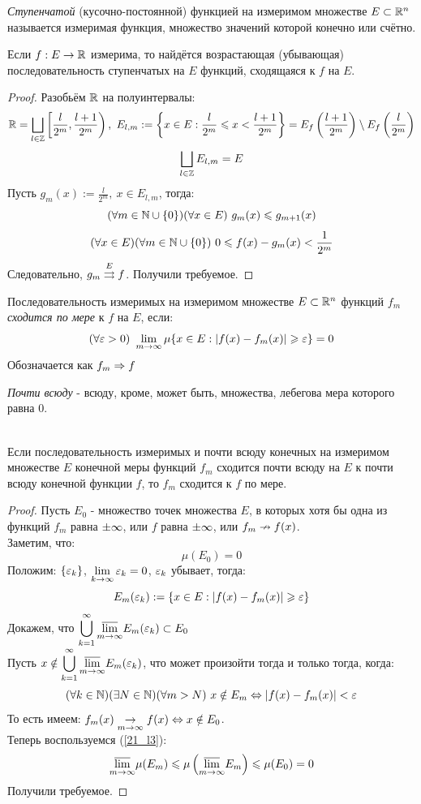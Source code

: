 \begin{definition}
	\textit{Ступенчатой} (кусочно-постоянной) функцией на измеримом множестве $E\subset\mathbb{R}^n$ называется измеримая функция, множество значений которой конечно или счётно.
\end{definition}
\begin{theorem}\label{24_th4}
	Если $f:E\rightarrow\mathbb{R}$ измерима, то найдётся возрастающая (убывающая) последовательность ступенчатых на $E$ функций, сходящаяся к $f$ на $E$.
\end{theorem}
\begin{proof}
	Разобьём $\mathbb{R}$ на полуинтервалы:
	\[\R=\bsc_{l\in\Z}\l[\frac{l}{2^m},\frac{l+1}{2^m}\r),\ 
	E_{l,m}:=\l\{x\in E:\frac l{2^m}\le x<\frac{l+1}{2^m}\r\}=E_f\l(\frac{l+1}{2^m}\r)\sm E_f\l(\frac l{2^m}\r)\]
	\[\bigsqcup_{l\in\mathbb{Z}}E_{l,m}=E\]
	Пусть $g_m(x):=\frac l{2^m},\ x\in E_{l,m}$, тогда:
	\[(\fa m\in\N\cup\{0\})(\fa x\in E)\ g_m(x)\le g_{m+1}(x)\]
	\[(\forall x\in E)(\forall m\in\mathbb{N}\cup\{0\})\ 0\leqslant f(x)-g_m(x)<\frac1{2^m}\]
	Следовательно, $g_m\overset{E}{\rightrightarrows}f$. Получили требуемое.
\end{proof}
\begin{definition}
	Последовательность измеримых на измеримом множестве $E\subset\mathbb{R}^n$ функций $f_m$ \textit{сходится по мере} к $f$ на $E$, если:
	\[(\fa\eps>0)\ \lim_{m\ra\i}\mu\{x\in E:|f(x)-f_m(x)|\ge\eps\}=0\]
	Обозначается как $f_m\Rightarrow f$
\end{definition}
\begin{definition}
	\textit{Почти всюду} - всюду, кроме, может быть, множества, лебегова мера которого равна 0.
\end{definition}
\begin{theorem}\label{24_th5}\\
	Если последовательность измеримых и почти всюду конечных на измеримом множестве $E$ конечной меры функций $f_m$ сходится почти всюду на $E$ к почти всюду конечной функции $f$, то $f_m$ сходится к $f$ по мере.
\end{theorem}
\begin{proof}
	Пусть $E_0$ - множество точек множества $E$, в которых хотя бы одна из функций $f_m$ равна $\pm\infty$, или $f$ равна $\pm\infty$, или $f_m\nrightarrow f(x)$.\\ Заметим, что:
	\[\mu(E_0)=0\]
	Положим: $\{\varepsilon_k\}$, $\lim_{k\ra\i}\eps_k=0$, $\varepsilon_k$ убывает, тогда:
	\[E_m(\varepsilon_k):=\{x\in E:|f(x)-f_m(x)|\geqslant\varepsilon\}\]
	Докажем, что $\ds\bc_{k=1}^\i\vlim[m\ra\i]E_m(\eps_k)\subset E_0$\\
	Пусть $\ds x\notin\bc_{k=1}^\i\vlim E_m(\eps_k)$, что может произойти тогда и только тогда, когда:
	\[(\fa k\in\N)(\ex N\in\N)(\fa m>N)\ x\notin E_m\lra|f(x)-f_m(x)|<\eps\]
	То есть имеем: $f_m(x)\underset{m\rightarrow\infty}{\rightarrow}f(x)\Leftrightarrow x\notin E_0$.\\
	Теперь воспользуемся (\ref{21_l3}):
	\[\vlim\mu(E_m)\le\mu\l(\vlim E_m\r)\le\mu(E_0)=0\]
	Получили требуемое.
\end{proof}
